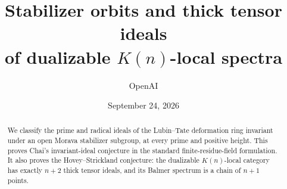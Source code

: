 \documentclass[11pt,a4paper]{article}
\title{Stabilizer orbits and thick tensor ideals\\of dualizable \(K(n)\)-local spectra}
\author{OpenAI}
\date{September 24, 2026}
\numberwithin{equation}{section}
\theoremstyle{definition}
\theoremstyle{remark}
\begin{document}
\maketitle
\begin{abstract}
We classify the prime and radical ideals of the Lubin--Tate deformation
ring invariant under an open Morava stabilizer subgroup, at every prime
and positive height.  This proves Chai's invariant-ideal conjecture in
the standard finite-residue-field formulation.  It also proves the
Hovey--Strickland conjecture: the dualizable \(K(n)\)-local category has
exactly \(n+2\) thick tensor ideals, and its Balmer spectrum is a chain
of \(n+1\) points.
\end{abstract}
\tableofcontents








\end{document}
